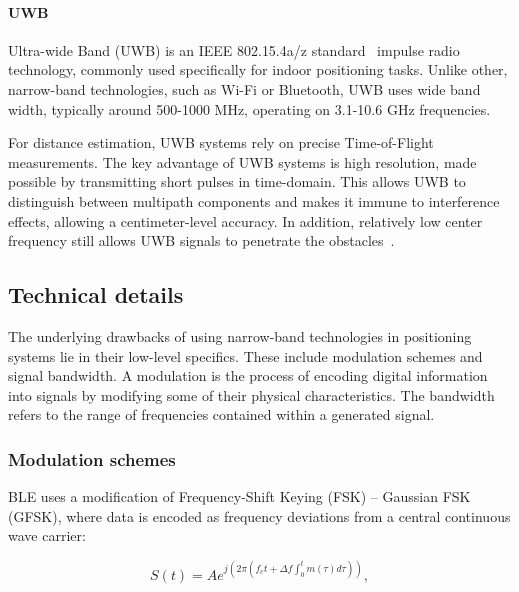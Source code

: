 \paragraph{UWB}
Ultra-wide Band (UWB) is an IEEE 802.15.4a/z standard~\cite{ieee802154}  impulse radio technology, commonly used specifically for indoor positioning tasks. Unlike other, narrow-band technologies, such as Wi-Fi or Bluetooth, UWB uses wide band width, typically around 500-1000 \si{\mega\hertz}, operating on 3.1-10.6 \si{\giga\hertz} frequencies.

For distance estimation, UWB systems rely on precise Time-of-Flight measurements. The key advantage of UWB systems is high resolution, made possible by transmitting short pulses in time-domain. This allows UWB to distinguish between multipath components and makes it immune to interference effects, allowing a centimeter-level accuracy. In addition, relatively low center frequency still allows UWB signals to penetrate the obstacles~\cite{cheraghinia2024comprehensive}.

\subsection{Technical details}

The underlying drawbacks of using narrow-band technologies in positioning systems lie in their low-level specifics. These include modulation schemes and signal bandwidth. A modulation is the process of encoding digital information into signals by modifying some of their physical characteristics. The bandwidth refers to the range of frequencies contained within a generated signal.

\subsubsection{Modulation schemes}


BLE uses a modification of Frequency-Shift Keying (FSK) -- Gaussian FSK (GFSK), where data is encoded as frequency deviations from a central continuous wave carrier:

\begin{equation}
S(t) = A e^{j\left(2\pi (f_c t + \Delta f \int_{0}^{t} m(\tau) d\tau)\right)},
\end{equation}

